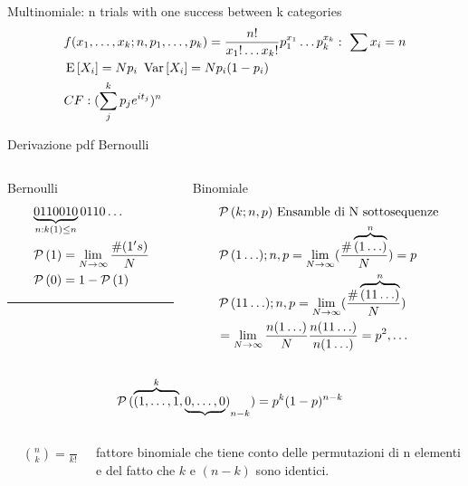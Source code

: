 \documentclass[asd-beamer.tex]{subfiles}%
\begin{document}
\begin{frame}{Multinomiale: n trials with one success between k categories}
	\begin{align*}
	&f(x_1,\ldots,x_k;n,p_1,\ldots,p_k)=\frac{n!}{x_1!\ldots x_k!}p_1^{x_1}\ldots p_k^{x_k}:\ \sum x_i=n\\
	&\operatorname{E}{[X_i]}=Np_i\ \operatorname{Var}{[X_i]}=Np_i(1-p_i)\\
	&CF: (\sum_j^kp_je^{it_j})^n
	\end{align*}
\end{frame}

\begin{wordonframe}{Derivazione pdf Bernoulli}
\begin{columns}[T]
\begin{column}{0.3\textwidth}
\begin{block}{Bernoulli}
\begin{align*}
&\underbrace{0110010}_{n:k(1)\leq n}0110\ldots\\
&\operatorname{\mathcal{P}}{(1)}=\lim_{N\to\infty}\frac{\#(1's)}{N}\\
&\operatorname{\mathcal{P}}{(0)}=1-\operatorname{\mathcal{P}}{(1)}\\
\end{align*}
\noindent\rule{0.9\textwidth}{0.4pt}
\end{block}
\end{column}
\begin{column}{0.7\textwidth}
\begin{block}{Binomiale}
\begin{align*}
&\operatorname{\mathcal{P}}{(k;n,p)}\ \text{Ensamble di N sottosequenze}\\
&\operatorname{\mathcal{P}}{(1\ldots);n,p}=\lim_{N\to\infty}(\frac{\#\overbrace{(1\ldots)}^n}{N})=p\\
&\operatorname{\mathcal{P}}{(11\ldots);n,p}=\lim_{N\to\infty}(\frac{\#\overbrace{(11\ldots)}^n}{N})\\
&=\lim_{N\to\infty}\frac{n(1\ldots)}{N}\frac{n(11\ldots)}{n(1\ldots)}=p^2, \ldots
\end{align*}
\end{block}
\end{column}
\end{columns}
\begin{align*}
&\operatorname{\mathcal{P}}{(\overbrace{(1,\ldots,1}^k,\underbrace{0,\ldots,0})}_{n-k})=p^k(1-p)^{n-k}
\end{align*}
\begin{columns}[T]
\begin{column}{0.2\textwidth}
\begin{align*}
&\binom{n}{k}=\frac{n!}{k!(n-k)!}
\end{align*}
\end{column}
\begin{column}{0.8\textwidth}
fattore binomiale che tiene conto delle permutazioni di n elementi e del fatto che $k$ e $(n-k)$ sono identici.
\end{column}
\end{columns}
\end{wordonframe}
\end{document}
